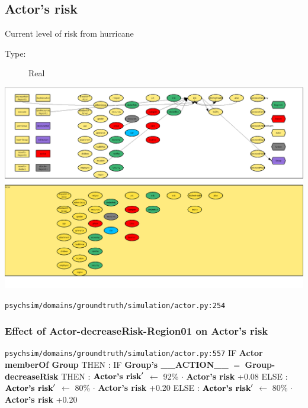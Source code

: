 \documentclass{article}%
\begin{document}
\subsection{Actor's risk}%
\label{subsec:Actor's risk}%
Current level of risk from hurricane%
\begin{description}%
\item[Type:]%
Real%
\end{description}%
\includegraphics[width=\textwidth]{images/riskOfActor.png}%
\begin{flushleft}%
\verb|psychsim/domains/groundtruth/simulation/actor.py:254|%
\end{flushleft}%
\subsubsection{Effect of Actor{-}decreaseRisk{-}Region01 on Actor's risk}%
\label{ssubsec:Effect of Actor{-}decreaseRisk{-}Region01 on Actor's risk}%
\begin{flushleft}%
\verb|psychsim/domains/groundtruth/simulation/actor.py:557|%
\linebreak%
IF %
\textbf{Actor memberOf Group}%
\linebreak%
\hspace*{2em}%
THEN %
: %
IF %
\textbf{Group's \_\_ACTION\_\_}%
$=$%
\textbf{Group{-}decreaseRisk}%
\linebreak%
\hspace*{4em}%
THEN %
: %
$\mbox{\textbf{Actor's risk}} '$%
$\leftarrow$%
92\%%
$\cdot$%
\textbf{Actor's risk}%
+0.08%
\linebreak%
\hspace*{4em}%
ELSE %
: %
$\mbox{\textbf{Actor's risk}} '$%
$\leftarrow$%
80\%%
$\cdot$%
\textbf{Actor's risk}%
+0.20%
\linebreak%
\hspace*{2em}%
ELSE %
: %
$\mbox{\textbf{Actor's risk}} '$%
$\leftarrow$%
80\%%
$\cdot$%
\textbf{Actor's risk}%
+0.20%
\end{flushleft}
\end{document}
